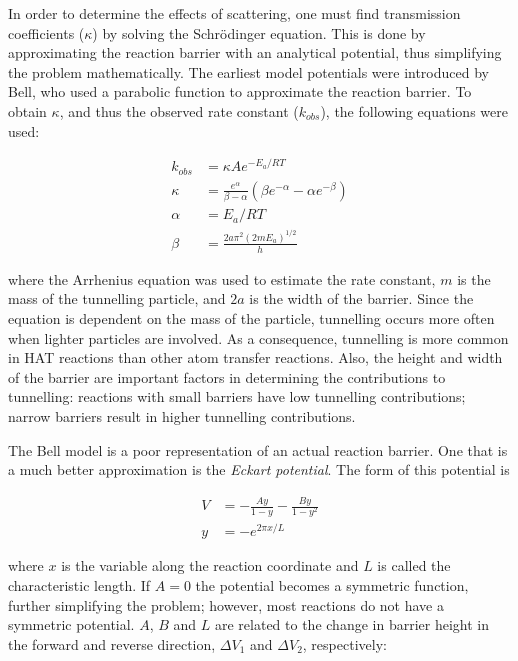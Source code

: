 In order to determine the effects of scattering, one must find transmission
coefficients ($\kappa$) by solving the Schr{\"o}dinger
equation.\cite{Griffiths2016} This is done by approximating the reaction
barrier with an analytical potential, thus simplifying the problem
mathematically. The earliest model potentials were introduced by Bell, who used
a parabolic function to approximate the reaction barrier.\cite{Bell1980} To
obtain $\kappa$, and thus the observed rate constant ($k_{obs}$), the following
equations were used:

\begin{align}
  k_{obs} &= \kappa A e^{-E_a/RT}  \\
\kappa &= \frac{e^\alpha}{\beta-\alpha} \left(\beta e^{-\alpha} - \alpha
  e^{-\beta} \right) \\
  \alpha &= E_a/RT \\
  \beta &= \frac{2a\pi^2(2mE_a)^{1/2}}{h}
\end{align}

\noindent where the Arrhenius equation was used to estimate the rate constant,
$m$ is the mass of the tunnelling particle, and $2a$ is the width of the
barrier. Since the equation is dependent on the mass of the particle,
tunnelling occurs more often when lighter particles are involved. As a
consequence, tunnelling is more common in HAT reactions than other atom
transfer reactions. Also, the height and width of the barrier are important
factors in determining the contributions to tunnelling: reactions with small
barriers have low tunnelling contributions; narrow barriers result in higher
tunnelling contributions.

The Bell model is a poor representation of an actual reaction barrier. One
that is a much better approximation is the \emph{Eckart
potential}.\cite{Johnston1962} The form of this potential is

\begin{align}
  V &= -\frac{Ay}{1-y} - \frac{By}{1-y^2} \\
  y &= -e^{2\pi x/L}
\end{align}

\noindent where $x$ is the variable along the reaction coordinate and $L$ is
called the characteristic length. If $A=0$ the potential becomes a symmetric
function, further simplifying the problem; however, most reactions do not have
a symmetric potential. $A$, $B$ and $L$ are related to the change in barrier
height in the forward and reverse direction, $\Delta V_1$ and $\Delta V_2$,
respectively:

